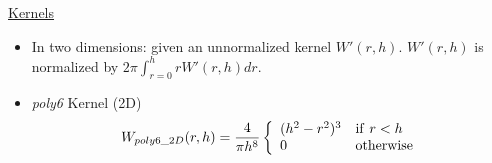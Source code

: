 \documentclass[10pt]{article}
\begin{document}
\underline{Kernels}
\begin{itemize}
    \item In two dimensions: given an unnormalized kernel $W'(r, h)$. $W'(r, h)$ is normalized by $2\pi\int_{r=0}^h r W'(r, h) dr$.
    \item \emph{poly6} Kernel (2D)
        \begin{eqnarray}
        W_{poly6\_2D}(r, h) = \frac{4}{\pi h^8}\left\{\begin{array}{ll} (h^2 - r^2)^3 & {\rm if\ } r < h \\ 0 & {\rm otherwise}\end{array}\right.
        \end{eqnarray}
\end{itemize}
\end{document}
